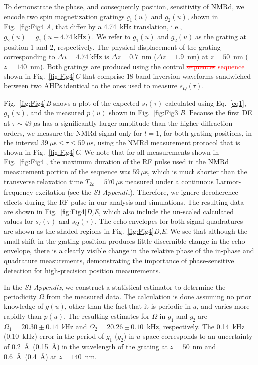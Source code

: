 \documentclass[9pt,twocolumn,twoside,lineno]{pnas-new}
\newcommand{\RB}[3][{}]{\textcolor{red}{\sout{#2} #3\ul{#1}}}
\begin{document}
To demonstrate the phase, and consequently position, sensitivity of NMRd, we encode two spin magnetization gratings $g_1(u)$ and $g_2(u)$, shown in Fig.~\ref{fig:Fig4}\textit{A}, that differ by a 4.74~kHz translation, i.e., $g_2(u) = g_1(u + 4.74~\text{kHz})$. We refer to $g_1(u)$ and $g_2(u)$ as the grating at position 1 and 2, respectively. The physical displacement of the grating corresponding to $\Delta u = 4.74~\text{kHz}$ is $\Delta z=0.7$~nm ($\Delta z=1.9$~nm) at $z = 50$~nm ($z = 140$~nm). Both gratings are produced using the control \RB{sequences}{sequence} shown in Fig.~\ref{fig:Fig4}\textit{C} that comprise 18 band inversion waveforms sandwiched between two AHPs identical to the ones used to measure $s_Q(\tau)$.

Fig.~\ref{fig:Fig4}\textit{B} shows a plot of the expected $s_I(\tau)$ calculated using Eq.~\ref{eq1}, $g_1(u)$, and the measured $p(u)$ shown in Fig.~\ref{fig:Fig3}\textit{B}. Because the first DE at $\tau\sim 49~\mu\text{s}$
has a significantly larger amplitude than the higher diffraction orders, we measure the NMRd signal only for $l=1$, for both grating positions, in the interval $39~\mu\text{s}\leq\tau\leq 59~\mu\text{s}$, using the NMRd measurement protocol that is shown in Fig.~\ref{fig:Fig4}\textit{C}.
We note that for all measurements shown in Fig.~\ref{fig:Fig4}, the maximum duration of the RF pulse used in the NMRd measurement portion of the sequence was $59\,\mu\text{s}$, which is much shorter than the transverse relaxation time  $T_{2\rho}=570\,\mu\text{s}$ measured under a continuous Larmor-frequency excitation (see the \textit{SI Appendix}). Therefore, we ignore decoherence effects during the RF pulse in our analysis and simulations. The resulting data are shown in Fig.~\ref{fig:Fig4}\textit{D,E}, which also include the un-scaled calculated values for $s_I(\tau)$ and $s_Q(\tau)$.
The echo envelopes for both signal quadratures are shown as the shaded regions in Fig.~\ref{fig:Fig4}\textit{D,E}. We see that although the small shift in the grating position produces little discernible change in the echo envelope, there is a clearly visible change in the relative phase of the in-phase and quadrature measurements, demonstrating the importance of phase-sensitive detection for high-precision position measurements.

In the \textit{SI Appendix}, we construct a statistical estimator \cite{Casella_1990} to determine the periodicity $\Omega$ from the measured data. The calculation is done assuming no prior knowledge of $g(u)$, other than the fact that it is periodic in $u$, and varies more rapidly than $p(u)$.
The resulting estimates for $\Omega$ in $g_1$ and $g_2$ are $\Omega_1 = 20.30 \pm 0.14$~kHz and $\Omega_2 = 20.26 \pm 0.10$~kHz, respectively. The 0.14~kHz (0.10~kHz) error in the period of $g_1$ ($g_2$) in $u$-space corresponds to an uncertainty of 0.2~\AA~(0.15~\AA) in the wavelength of the grating at $z = 50$~nm and 0.6~\AA~(0.4~\AA) at $z = 140$~nm.
\end{document}
